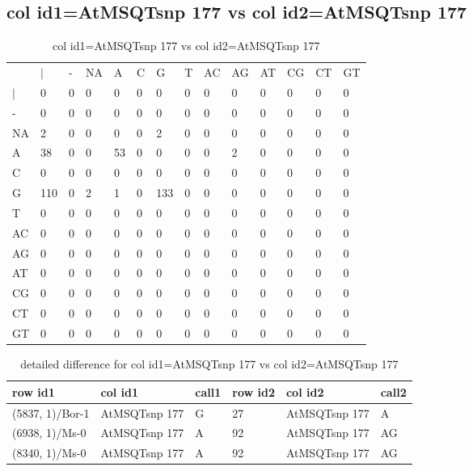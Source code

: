\subsection{col id1=AtMSQTsnp 177 vs col id2=AtMSQTsnp 177}
\begin{center}
\begin{longtable}{|l|l|l|l|l|l|l|l|l|l|l|l|l|l|}
\caption{col id1=AtMSQTsnp 177 vs col id2=AtMSQTsnp 177} \label{table_dm750}\\
\hline
\\
\hline
&$|$&-&NA&A&C&G&T&AC&AG&AT&CG&CT&GT\\
$|$&0&0&0&0&0&0&0&0&0&0&0&0&0\\
-&0&0&0&0&0&0&0&0&0&0&0&0&0\\
NA&2&0&0&0&0&2&0&0&0&0&0&0&0\\
A&38&0&0&53&0&0&0&0&2&0&0&0&0\\
C&0&0&0&0&0&0&0&0&0&0&0&0&0\\
G&110&0&2&1&0&133&0&0&0&0&0&0&0\\
T&0&0&0&0&0&0&0&0&0&0&0&0&0\\
AC&0&0&0&0&0&0&0&0&0&0&0&0&0\\
AG&0&0&0&0&0&0&0&0&0&0&0&0&0\\
AT&0&0&0&0&0&0&0&0&0&0&0&0&0\\
CG&0&0&0&0&0&0&0&0&0&0&0&0&0\\
CT&0&0&0&0&0&0&0&0&0&0&0&0&0\\
GT&0&0&0&0&0&0&0&0&0&0&0&0&0\\
\hline
\end{longtable}
\end{center}

\begin{center}
\begin{longtable}{|l|l|l|l|l|l|}
\caption{detailed difference for col id1=AtMSQTsnp 177 vs col id2=AtMSQTsnp 177} \label{table_dm751}\\
\hline
row id1&col id1&call1&row id2&col id2&call2\\
\hline
(5837, 1)/Bor-1&AtMSQTsnp 177&G&27&AtMSQTsnp 177&A\\
(6938, 1)/Ms-0&AtMSQTsnp 177&A&92&AtMSQTsnp 177&AG\\
(8340, 1)/Ms-0&AtMSQTsnp 177&A&92&AtMSQTsnp 177&AG\\
\hline
\end{longtable}
\end{center}

